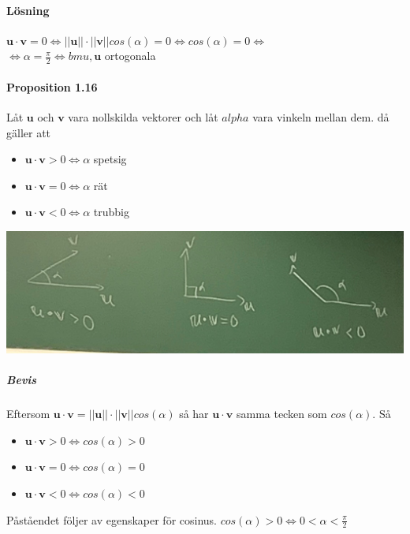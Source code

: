     \paragraph{Lösning} $\bm{u}\cdot \bm{v}=0 \Leftrightarrow ||\bm{u}||\cdot ||\bm{v}||cos(\alpha)=0 \Leftrightarrow cos(\alpha)=0 \Leftrightarrow $\\
    $\Leftrightarrow \alpha = \frac{\pi}{2} \Leftrightarrow bm{u}, \bm{u}$ ortogonala
    
    \paragraph{Proposition 1.16} Låt $\bm{u}$ och $\bm{v}$ vara nollskilda vektorer och låt $alpha$ vara vinkeln mellan dem.
    då gäller att 
    \begin{itemize}
        \item $\bm{u} \cdot \bm{v} > 0 \Leftrightarrow \alpha$ spetsig
        \item $\bm{u} \cdot \bm{v} = 0\Leftrightarrow \alpha$ rät
        \item $\bm{u} \cdot \bm{v} < 0\Leftrightarrow \alpha$ trubbig
    \end{itemize}
    \includegraphics[scale=0.15]{imgs/22-01-20-img03.jpg}
    \subparagraph{Bevis} Eftersom $\bm{u} \cdot \bm{v} = ||\bm{u}|| \cdot ||\bm{v}||cos(\alpha)$ så har $\bm{u} \cdot \bm{v}$ samma tecken som $cos(\alpha)$.
    Så 
    \begin{itemize}
        \item $\bm{u} \cdot \bm{v} > 0 \Leftrightarrow cos(\alpha) > 0$
        \item $\bm{u} \cdot \bm{v} = 0 \Leftrightarrow cos(\alpha) = 0$
        \item $\bm{u} \cdot \bm{v} < 0 \Leftrightarrow cos(\alpha) < 0$
    \end{itemize}
    Påståendet följer av egenskaper för cosinus. $cos(\alpha) > 0 \Leftrightarrow 0 < \alpha < \frac{\pi}{2}$
    
